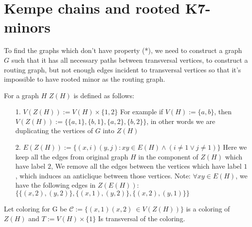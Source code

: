\section{Kempe chains and rooted K7-minors}

To find the graphs which don't have property (*), we need to construct a graph $G$ such that it has all necessary paths between transversal vertices, to construct a routing graph,
but not enough edges incident to transversal vertices so that it's impossible to have rooted minor as the routing graph.

\begin{defn}[Z(H)]
    For a graph $H$ $Z(H)$ is defined as follows:
    \begin{itemize}
        \item[1.] $V(Z(H)) := V(H) \times \{1, 2\}$ \newline
        For example if $V(H) := \{a, b\}$, then $V(Z(H)) := \{\{a, 1\}, \{b, 1\}, \{a, 2\}, \{b, 2\}\}$,
        in other words we are duplicating the vertices of $G$ into $Z(H)$
        \item[2.]  $E(Z(H)) := \{(x, i)(y, j) : xy \in E(H) \land (i \neq 1 \lor j \neq 1)\}$ \newline
        Here we keep all the edges from original graph $H$ in the component of $Z(H)$ which have label $2$, 
        We remove all the edges between the vertices which have label $1$, which induces an anticlique between those vertices.
        Note: $\forall xy \in E(H)$, we have the following edges in $Z(E(H))$: $\{\{(x, 2), (y, 2)\}, \{(x, 1), (y, 2)\}, \{(x, 2), (y, 1)\}\}$
      \end{itemize}
\end{defn}
Let coloring for G be $\mathcal{C} := \{(x, 1)(x, 2)\ \in V(Z(H))\}$ is a coloring of $Z(H)$ and $T := V(H) \times \{1\}$
Is transversal of the coloring.
